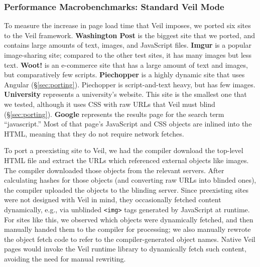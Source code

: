 \subsubsection{Performance Macrobenchmarks: Standard Veil Mode}
\label{sec:macrobench}

To measure the increase in page load
time that Veil imposes, we ported six sites
to the Veil framework.  \textbf{Washington Post}
is the biggest site that we ported, and contains
large amounts of text, images, and JavaScript
files. \textbf{Imgur} is a popular image-sharing
site; compared to the other test sites, it has
many images but less text. \textbf{Woot!} is an
e-commerce site that has a large amount of text
and images, but comparatively few scripts.
\textbf{Piechopper} is a highly dynamic site that
uses Angular (\S\ref{sec:porting}). Piechopper is
script-and-text heavy, but has few images.
\textbf{University} represents a university's
website. This site is the smallest
one that we tested, although it uses CSS with raw
URLs that Veil must blind (\S\ref{sec:porting}).
\textbf{Google} represents the results page for
the search term ``javascript.''  Most of that page's
JavaScript and CSS objects are inlined into
the HTML, meaning that they do not require
network fetches. 

To port a preexisting site to Veil, we had the
compiler download the top-level HTML file and
extract the URLs which referenced external objects like
images. The compiler downloaded those objects from
the relevant servers. After calculating hashes
for those objects (and converting raw URLs into
blinded ones), the compiler uploaded the objects
to the blinding server. Since preexisting sites
were not designed with Veil in mind, they
occasionally fetched content dynamically, e.g.,
via unblinded \texttt{<img>} tags generated by
JavaScript at runtime. For sites like this, we
observed which objects were dynamically fetched,
and then manually handed them to the compiler
for processing; we also manually rewrote the
object fetch code to refer to the compiler-generated
object names. Native Veil pages would invoke
the Veil runtime library to dynamically fetch
such content, avoiding the need for manual
rewriting. \\

